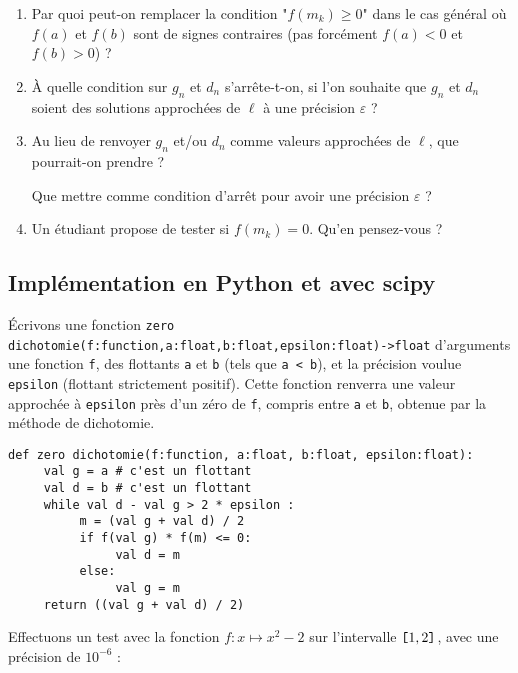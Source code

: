  \begin{enumerate}
 \item Par quoi peut-on remplacer la condition "$f(m_k)\geq 0$" dans le cas général où $f(a)$ et $f(b)$ sont de signes contraires (pas forcément $f(a)<0$ et $f(b)>0$) ?

 \item \`A quelle condition sur $g_n$ et $d_n$ s'arrête-t-on, si l'on souhaite que $g_n$ et $d_n$ soient des solutions approchées de $\ell$ à une précision $\varepsilon$ ?

 \item  Au lieu de renvoyer $g_n$ et/ou $d_n$ comme valeurs approchées de $\ell$, que pourrait-on prendre ? 
 
 Que mettre comme condition d'arrêt pour avoir une précision $\varepsilon$  ? 

 \item Un étudiant propose de tester si $f(m_k)=0$.  Qu'en pensez-vous ?

\end{enumerate}


\subsection{Implémentation en Python et avec scipy}
\'Ecrivons une fonction \texttt{zero dichotomie(f:function,a:float,b:float,epsilon:float)->float} d'arguments une fonction \texttt{f}, des flottants \texttt{a} et \texttt{b} (tels que \texttt{a < b}), et  la précision voulue \texttt{epsilon} (flottant strictement positif). Cette fonction renverra une valeur approchée à \texttt{epsilon} près d'un zéro de \texttt{f}, compris entre \texttt{a} et \texttt{b}, obtenue par la méthode de dichotomie.

\begin{lstlisting}
def zero dichotomie(f:function, a:float, b:float, epsilon:float):
     val g = a # c'est un flottant
     val d = b # c'est un flottant
     while val d - val g > 2 * epsilon :
          m = (val g + val d) / 2
          if f(val g) * f(m) <= 0:
               val d = m
          else:
               val g = m
     return ((val g + val d) / 2)
\end{lstlisting}

Effectuons un test avec la fonction $f : x \mapsto x^2-2$ sur l'intervalle $\verb![!1,2\verb!]!$, avec une précision de $10^{-6}$ :
 
